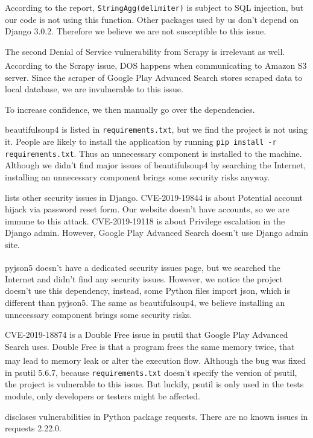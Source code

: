 \documentclass[12pt, a4paper]{article}
\newcommand{\code}[1]{\texttt{#1}}
\begin{document}
According to the report, \code{StringAgg(delimiter)} is subject to SQL injection, but our code is not using this function. Other packages used by us don't depend on Django 3.0.2. Therefore we believe we are not susceptible to this issue.

The second Denial of Service vulnerability from Scrapy is irrelevant as well. According to the Scrapy issue\textsuperscript{\cite{scrapy-s3}}, DOS happens when communicating to Amazon S3 server. Since the scraper of Google Play Advanced Search stores scraped data to local database, we are invulnerable to this issue.


To increase confidence, we then manually go over the dependencies.

beautifulsoup4 is listed in \code{requirements.txt}, but we find the project is not using it. People are likely to install the application by running \code{pip install -r requirements.txt}. Thus an unnecessary component is installed to the machine. Although we didn't find major issues of beautifulsoup4 by searching the Internet, installing an unnecessary component brings some security risks anyway.


\cite{django-security-issues} lists other security issues in Django. CVE-2019-19844 is about Potential account hijack via password reset form. Our website doesn't have accounts, so we are immune to this attack. CVE-2019-19118 is about Privilege escalation in the Django admin. However, Google Play Advanced Search doesn't use Django admin site.

pyjson5\textsuperscript{\cite{pyjson5}} doesn't have a dedicated security issues page, but we searched the Internet and didn't find any security issues. However, we notice the project doesn't use this dependency, instead, some Python files import json, which is different than pyjson5. The same as beautifulsoup4, we believe installing an unnecessary component brings some security risks.

CVE-2019-18874 is a Double Free issue in psutil that Google Play Advanced Search uses. Double Free is that a program frees the same memory twice, that may lead to memory leak or alter the execution flow.\textsuperscript{\cite{double-free}} Although the bug was fixed in psutil 5.6.7, because \code{requirements.txt} doesn't specify the version of psutil, the project is vulnerable to this issue. But luckily, psutil is only used in the tests module, only developers or testers might be affected.

\cite{requests-security-vulnerabilities} discloses vulnerabilities in Python package requests. There are no known issues in requests 2.22.0.
\end{document}
